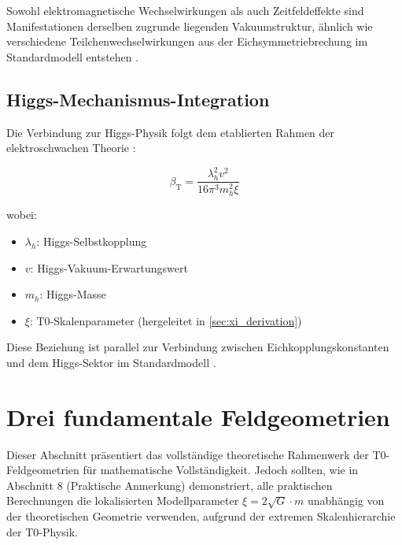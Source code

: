 \documentclass[12pt,a4paper]{article}
\newcommand{\betaT}{\beta_{\text{T}}}
\begin{document}
	\begin{tcolorbox}[colback=blue!5!white,colframe=blue!75!black,title=Vakuumstruktur-Einheit]
		Sowohl elektromagnetische Wechselwirkungen als auch Zeitfeldeffekte sind Manifestationen derselben zugrunde liegenden Vakuumstruktur, ähnlich wie verschiedene Teilchenwechselwirkungen aus der Eichsymmetriebrechung im Standardmodell entstehen \citep{weinberg2003,peskin1995}.
	\end{tcolorbox}
	
	\subsection{Higgs-Mechanismus-Integration}
	\label{subsec:higgs_mechanism}
	
	Die Verbindung zur Higgs-Physik folgt dem etablierten Rahmen der elektroschwachen Theorie \citep{higgs1964,englert1964,weinberg1967,salam1968}:
	
	\begin{equation}
		\label{eq:higgs_connection}
		\betaT = \frac{\lambda_h^2 v^2}{16\pi^3 m_h^2 \xi}
	\end{equation}
	
	wobei:
	\begin{itemize}
		\item $\lambda_h$: Higgs-Selbstkopplung \citep{djouadi2008}
		\item $v$: Higgs-Vakuum-Erwartungswert \citep{weinberg2003}
		\item $m_h$: Higgs-Masse \citep{aad2012,chatrchyan2012}
		\item $\xi$: T0-Skalenparameter (hergeleitet in \cref{sec:xi_derivation})
	\end{itemize}
	
	Diese Beziehung ist parallel zur Verbindung zwischen Eichkopplungskonstanten und dem Higgs-Sektor im Standardmodell \citep{peskin1995,weinberg2003}.
	
	\section{Drei fundamentale Feldgeometrien}
	\label{sec:three_geometries}
	
	\begin{tcolorbox}[colback=orange!5!white,colframe=orange!75!black,title=Wichtige methodische Anmerkung]
		Dieser Abschnitt präsentiert das vollständige theoretische Rahmenwerk der T0-Feldgeometrien für mathematische Vollständigkeit. Jedoch sollten, wie in Abschnitt 8 (Praktische Anmerkung) demonstriert, alle praktischen Berechnungen die lokalisierten Modellparameter $\xi = 2\sqrt{G} \cdot m$ unabhängig von der theoretischen Geometrie verwenden, aufgrund der extremen Skalenhierarchie der T0-Physik.
	\end{tcolorbox}
	
\end{document}
